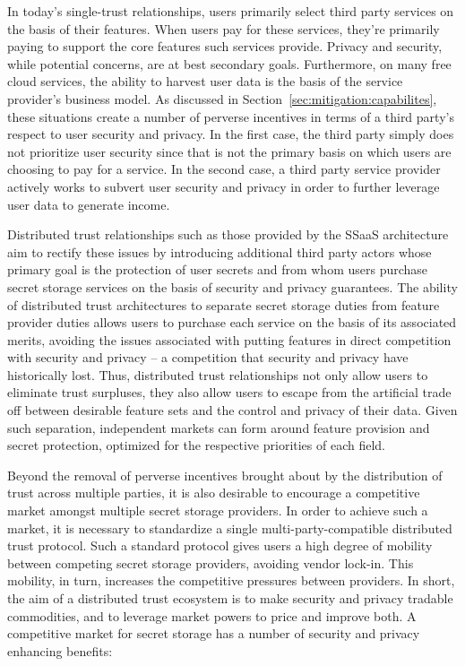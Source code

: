 In today's single-trust relationships, users primarily select third
party services on the basis of their features. When users pay for
these services, they're primarily paying to support the core features
such services provide. Privacy and security, while potential concerns,
are at best secondary goals. Furthermore, on many free cloud services,
the ability to harvest user data is the basis of the service
provider's business model. As discussed in
Section~\ref{sec:mitigation:capabilites}, these situations create a
number of perverse incentives in terms of a third party's respect to
user security and privacy. In the first case, the third party simply
does not prioritize user security since that is not the primary basis
on which users are choosing to pay for a service. In the second case,
a third party service provider actively works to subvert user security
and privacy in order to further leverage user data to generate income.

Distributed trust relationships such as those provided by the SSaaS
architecture aim to rectify these issues by introducing additional
third party actors whose primary goal is the protection of user
secrets and from whom users purchase secret storage services on the
basis of security and privacy guarantees. The ability of distributed
trust architectures to separate secret storage duties from feature
provider duties allows users to purchase each service on the basis of
its associated merits, avoiding the issues associated with putting
features in direct competition with security and privacy -- a
competition that security and privacy have historically lost. Thus,
distributed trust relationships not only allow users to eliminate
trust surpluses, they also allow users to escape from the artificial
trade off between desirable feature sets and the control and privacy
of their data. Given such separation, independent markets can form
around feature provision and secret protection, optimized for the
respective priorities of each field.

Beyond the removal of perverse incentives brought about by the
distribution of trust across multiple parties, it is also desirable to
encourage a competitive market amongst multiple secret storage
providers. In order to achieve such a market, it is necessary to
standardize a single multi-party-compatible distributed trust
protocol. Such a standard protocol gives users a high degree of
mobility between competing secret storage providers, avoiding vendor
lock-in. This mobility, in turn, increases the competitive pressures
between providers. In short, the aim of a distributed trust ecosystem
is to make security and privacy tradable commodities, and to leverage
market powers to price and improve both. A competitive market for
secret storage has a number of security and privacy enhancing
benefits:

